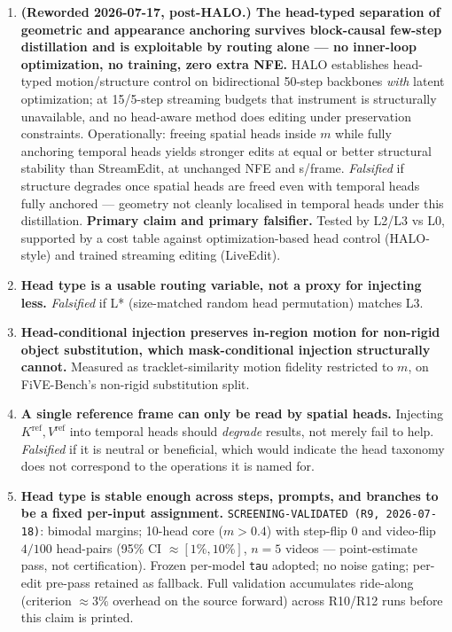 \documentclass{article}
\begin{document}
\begin{enumerate}
  \item \textbf{(Reworded 2026-07-17, post-HALO.) The head-typed separation of
        geometric and appearance anchoring survives block-causal few-step
        distillation and is exploitable by routing alone --- no inner-loop
        optimization, no training, zero extra NFE.} HALO establishes head-typed
        motion/structure control on bidirectional 50-step backbones \emph{with}
        latent optimization; at 15/5-step streaming budgets that instrument is
        structurally unavailable, and no head-aware method does editing under
        preservation constraints. Operationally: freeing spatial heads inside
        $m$ while fully anchoring temporal heads yields stronger edits at equal
        or better structural stability than StreamEdit, at unchanged NFE and
        s/frame. \emph{Falsified} if structure degrades once spatial heads are
        freed even with temporal heads fully anchored --- geometry not cleanly
        localised in temporal heads under this distillation. \textbf{Primary
        claim and primary falsifier.} Tested by L2/L3 vs L0, supported by a
        cost table against optimization-based head control (HALO-style) and
        trained streaming editing (LiveEdit).
  \item \textbf{Head type is a usable routing variable, not a proxy for
        injecting less.} \emph{Falsified} if L* (size-matched random head
        permutation) matches L3.
  \item \textbf{Head-conditional injection preserves in-region motion for
        non-rigid object substitution, which mask-conditional injection
        structurally cannot.} Measured as tracklet-similarity motion fidelity
        restricted to $m$, on FiVE-Bench's non-rigid substitution split.
  \item \textbf{A single reference frame can only be read by spatial heads.}
        Injecting $K^{\mathrm{ref}},V^{\mathrm{ref}}$ into temporal heads should
        \emph{degrade} results, not merely fail to help. \emph{Falsified} if it
        is neutral or beneficial, which would indicate the head taxonomy does
        not correspond to the operations it is named for.
  \item \textbf{Head type is stable enough across steps, prompts, and branches
        to be a fixed per-input assignment.}
        \texttt{SCREENING-VALIDATED (R9, 2026-07-18)}: bimodal margins; 10-head
        core ($m > 0.4$) with step-flip $0$ and video-flip $4/100$ head-pairs
        (95\% CI $\approx [1\%, 10\%]$, $n = 5$ videos --- point-estimate pass,
        not certification). Frozen per-model \texttt{tau} adopted; no noise
        gating; per-edit pre-pass retained as fallback. Full validation
        accumulates ride-along (criterion $\approx 3\%$ overhead on the source
        forward) across R10/R12 runs before this claim is printed.
\end{enumerate}
\end{document}
